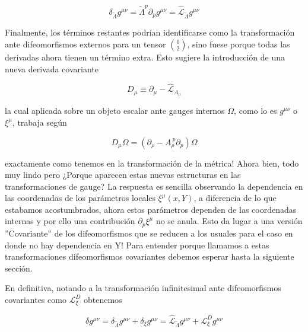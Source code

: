 \documentclass{article}
\numberwithin{equation}{section}
\begin{document}
\begin{equation}
\delta_{\widetilde{\Lambda}} g^{\mu \nu} = \widetilde{\Lambda}^{p} \partial_p g^{\mu \nu} = \hat{\mathcal{L}}_{\widetilde{\Lambda}} g^{\mu \nu}
\end{equation}

Finalmente, los términos restantes podrían identificarse como la transformación ante difeomorfismos externos para un tensor $ \binom{0}{2} $, sino fuese porque todas las derivadas ahora tienen un término extra. Esto sugiere la introducción de una nueva derivada covariante

\begin{equation}\label{Dcov}
D_{\mu} \equiv \partial_{\mu} - \hat{\mathcal{L}}_{A_{\mu}}
\end{equation}

la cual aplicada sobre un objeto escalar ante gauges internos $ \Omega $, como lo es $ g^{\mu \nu} $ o $ \xi^{\mu} $, trabaja según

\begin{equation}
D_{\mu} \Omega = \left( \partial_{\rho} - A_{\rho}^{\ p} \partial_p \right) \Omega
\end{equation}

exactamente como tenemos en la transformación de la métrica! Ahora bien, todo muy lindo pero ¿Porque aparecen estas nuevas estructuras en las transformaciones de gauge? La respuesta es sencilla observando la dependencia en las coordenadas de los parámetros locales $ \xi^{\mu}(x,Y) $, a diferencia de lo que estabamos acostumbrados, ahora estos parámetros dependen de las coordenadas internas y por ello una contribución $ \partial_p \xi^{\mu} $ no se anula. Esto da lugar a una versión ''Covariante'' de los difeomorfismos que se reducen a los usuales para el caso en donde no hay dependencia en Y! Para entender porque llamamos a estas transformaciones difeomorfismos covariantes debemos esperar hasta la siguiente sección.

En definitiva, notando a la transformación infinitesimal ante difeomorfismos covariantes como $ \mathcal{L}_{\xi}^{D} $ obtenemos 

\begin{boxquation}
\begin{equation}\label{deltag}
\delta g^{\mu \nu} = \delta_{\widetilde{\Lambda}} g^{\mu \nu} + \delta_{\xi} g^{\mu \nu} = 
\hat{\mathcal{L}}_{\widetilde{\Lambda}} g^{\mu \nu} + \mathcal{L}_{\xi}^{D}  g^{\mu \nu}
\end{equation}
\end{boxquation}
\end{document}
